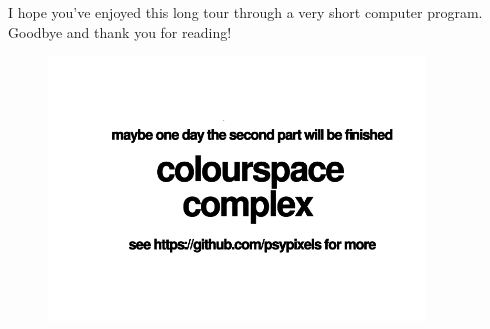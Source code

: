 I hope you've enjoyed this long tour through a very short computer program. Goodbye and thank you for reading!

\vspace*{\fill}
\begin{figure}[H]
    \centering
\href{https://github.com/mwenge/psypixels}{
      \includegraphics[width=10cm]{src/cover/title_page_colorspace_coming_soon.png}%
}
\end{figure}

\vspace*{\fill}
